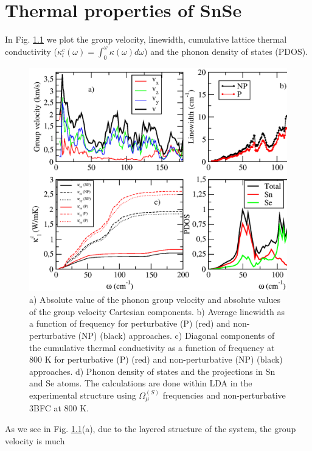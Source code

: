 
\chapter{Thermal properties of SnSe} %

\label{thermal-properties} %

In Fig. \ref{thermal-analysis} we plot the group velocity, linewidth, cumulative lattice thermal conductivity
($\kappa_{l}^{c}(\omega)=\int_{0}^{\omega}\kappa(\omega)d\omega$) and the phonon density of states (PDOS).
\begin{figure}[th]
\includegraphics[width=\linewidth]{Figures/thermal_analysis.eps}
\caption{a) Absolute value of the phonon group velocity and absolute values of the group velocity Cartesian 
components. b) Average linewidth as a function of frequency for perturbative (P) (red) and non-perturbative (NP) 
(black) approaches. c) Diagonal components of the cumulative thermal conductivity as a function of frequency at $800$ 
K for perturbative (P) (red) and non-perturbative (NP) (black) approaches. d) Phonon density of states and the 
projections in Sn and Se atoms. The calculations are done within LDA in the experimental structure using 
$\Omega^{(S)}_{\mu}$ frequencies and non-perturbative 3BFC at $800$ K.}
\label{thermal-analysis}
\end{figure}
As we see in Fig. \ref{thermal-analysis}(a), due to the layered structure of the system, the group velocity is much 
